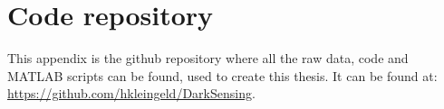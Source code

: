 \chapter{Code repository}
\label{app_repository}
This appendix is the github repository where all the raw data, code and MATLAB scripts can be found, used to create this thesis. It can be found at:  \url{https://github.com/hkleingeld/DarkSensing}.

